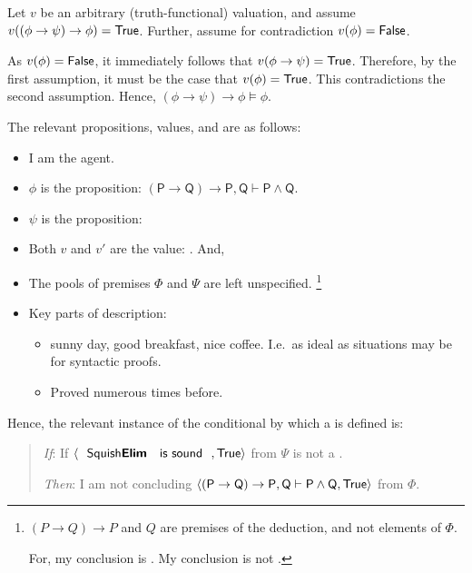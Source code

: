 \begin{note}
{    Let \(v\) be an arbitrary (truth-functional) valuation, and assume \(v((\phi \rightarrow \psi) \rightarrow \phi) = \text{\textsf{True}}\).
    Further, assume for contradiction \(v(\phi) = \text{\textsf{False}}\).

    As \(v(\phi) = \text{\textsf{False}}\), it immediately follows that \(v(\phi \rightarrow \psi) = \text{\textsf{True}}\).
    Therefore, by the first assumption, it must be the case that \(v(\phi) = \text{\textsf{True}}\).
    This contradictions the second assumption.
    Hence, \((\phi \rightarrow \psi) \rightarrow \phi \vDash \phi\).
  }

  The relevant propositions, values, and  are as follows:
  \begin{itemize}[noitemsep]
  \item
    I am the agent.
  \item
    \(\phi\) is the proposition: \(\mathsf{(P \rightarrow Q) \rightarrow P, Q \vdash P \land Q}\).
  \item
    \(\psi\) is the proposition: 
  \item
    Both \(v\) and \(v'\) are the value: .
    And,
  \item
    The pools of premises \(\Phi\) and \(\Psi\) are left unspecified.%
    \footnote{
      \((P \rightarrow Q) \rightarrow P\) and \(Q\) are premises of the deduction, and not elements of \(\Phi\).

      For, my conclusion is .
      My conclusion is not .
    }
  \item
    Key parts of description:
    \begin{itemize}[noitemsep]
    \item
      sunny day, good breakfast, nice coffee.
      I.e.\ as ideal as situations may be for syntactic proofs.
    \item
      Proved \sqE{} numerous times before.
    \end{itemize}
  \end{itemize}

  Hence, the relevant instance of the conditional by which a \requ{} is defined is:

  \begin{quote}
    \begin{itenum}
    \item[\emph{If}:]
      If \(\pv{\propI{\sqE{} is sound}}{\valI{True}}\) from \(\Psi\) is not a \fc{}.
    \item[\emph{Then}:]
      I am not concluding \(\langle \mathsf{(P \rightarrow Q) \rightarrow P, Q \vdash P \land Q}, \text{\textsf{True}} \rangle\) from \(\Phi\).
    \end{itenum}
  \end{quote}


\end{note}
